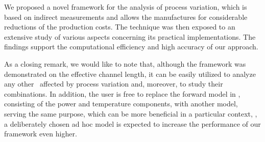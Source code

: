We proposed a novel framework for the analysis of process variation, which is based on indirect measurements and allows the manufactures for considerable reductions of the production costs. The technique was then exposed to an extensive study of various aspects concerning its practical implementations. The findings support the computational efficiency and high accuracy of our approach.

As a closing remark, we would like to note that, although the framework was demonstrated on the effective channel length, it can be easily utilized to analyze any other \qois\ affected by process variation and, moreover, to study their combinations. In addition, the user is free to replace the forward model in , consisting of the power and temperature components, with another model, serving the same purpose, which can be more beneficial in a particular context, \eg, a deliberately chosen ad hoc model is expected to increase the performance of our framework even higher.
